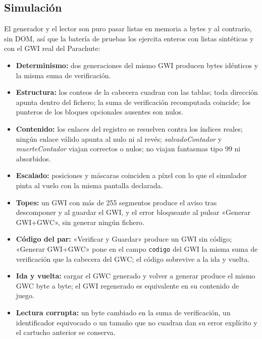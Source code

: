 \subsection{Simulación}\label{sec:F5I6Simulacion}

El generador y el lector son puro pasar listas en memoria a bytes
y al contrario, sin DOM, así que la batería de pruebas los ejercita
enteros con listas sintéticas y con el GWI real del Parachute:

\begin{itemize}	
	\item \textbf{Determinismo:} dos generaciones del mismo GWI
	producen bytes idénticos y la misma suma de verificación.	
	
	\item \textbf{Estructura:} los conteos de la cabecera cuadran
	con las tablas; toda dirección apunta dentro del fichero; la
	suma de verificación recomputada coincide; los punteros de los
	bloques opcionales ausentes son nulos.	
	
	\item \textbf{Contenido:} los enlaces del registro se resuelven
	contra los índices reales; ningún enlace válido apunta al nulo
	ni al revés; \emph{salvadoContador} y \emph{muerteContador}
	viajan correctos o nulos; no viajan fantasmas tipo 99 ni
	absorbidos.	
	
	\item \textbf{Escalado:} posiciones y máscaras coinciden a
	píxel con lo que el simulador pinta al vuelo con la misma
	pantalla declarada.	
	
	\item \textbf{Topes:} un GWI con más de 255 segmentos produce el
	aviso tras descomponer y al guardar el GWI, y el error
	bloqueante al pulsar «Generar GWI+GWC», sin generar ningún
	fichero.	
	
	\item \textbf{Código del par:} «Verificar y Guardar» produce un
	GWI sin código; «Generar GWI+GWC» pone en el campo
	\texttt{codigo} del GWI la misma suma de verificación que la
	cabecera del GWC; el código sobrevive a la ida y vuelta.	
	
	\item \textbf{Ida y vuelta:} cargar el GWC generado y volver a
	generar produce el mismo GWC byte a byte; el GWI regenerado es
	equivalente en su contenido de juego.	
	
	\item \textbf{Lectura corrupta:} un byte cambiado en la suma de
	verificación, un identificador equivocado o un tamaño que no
	cuadran dan su error explícito y el cartucho anterior se
	conserva.
\end{itemize}


